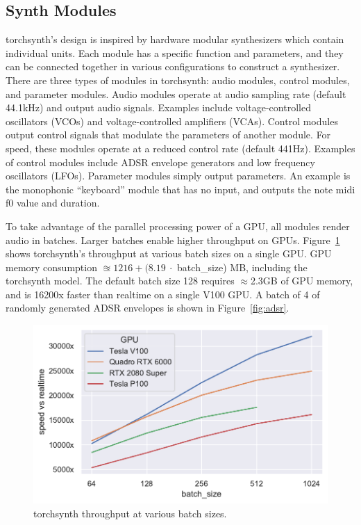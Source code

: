 \subsection{Synth Modules}
torchsynth's design is inspired by hardware modular synthesizers which contain individual units. Each module has a specific function and parameters, and they can be connected together in various configurations to construct a synthesizer. There are three types of modules in torchsynth: audio modules, control modules, and parameter modules. Audio modules operate at audio sampling rate (default 44.1kHz) and output audio signals. Examples include voltage-controlled oscillators (VCOs) and voltage-controlled amplifiers (VCAs). Control modules output control signals that modulate the parameters of another module. For speed, these modules operate at a reduced control rate (default 441Hz). Examples of control modules include ADSR envelope generators and low frequency oscillators (LFOs). Parameter modules simply output parameters. An example is the monophonic ``keyboard'' module that has no input, and outputs the note midi f0 value and duration.

To take advantage of the parallel processing power of a GPU, all modules render audio in batches. Larger batches enable higher throughput on GPUs.  Figure~\ref{fig:gpu-profiles} shows torchsynth's throughput at various batch sizes on a single GPU. GPU memory consumption $\approxeq 1216 + (8.19\ \cdot $ batch\_size) MB, including the torchsynth model. The default batch size 128 requires $\approx$2.3GB of GPU memory, and is 16200x faster than realtime on a single V100 GPU. %
A batch of 4 of randomly generated ADSR envelopes is shown in Figure~\ref{fig:adsr}.



\begin{figure}[t]
    \centering
    \includegraphics[width=0.66\linewidth]{gpu-profiles.pdf}
  \vspace{-1.5em}
    \caption{torchsynth throughput at various batch sizes.}
    \label{fig:gpu-profiles}
\end{figure}

